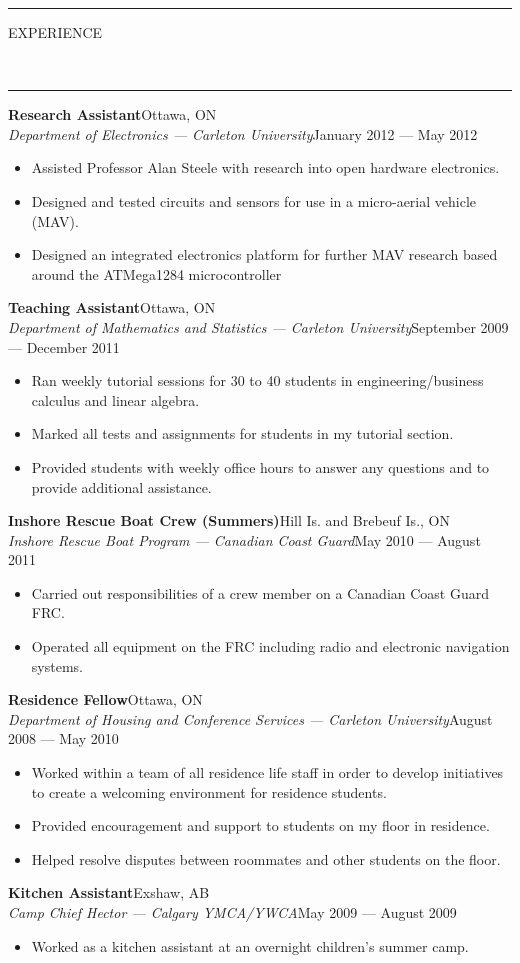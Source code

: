 \documentclass[10pt, letterpaper, oneside]{article}
\newcommand{\HRule}[2]{\textcolor{#1}{\rule{\linewidth}{#2}}}
\newcommand{\sectiontitle}[1]{\begin{minipage}{\textwidth}\HRule{black}{0.25mm}\vspace{-10pt}\begin{center}\Large\MakeUppercase{#1}\end{center}\end{minipage}\\\HRule{light-grey}{0.15mm}\vspace{\baselineskip}}
\newenvironment{ressection}[1]{
  \sectiontitle{#1}}
  {\vspace{-\baselineskip}}
\newcommand{\resitem}[1]{
	\vspace{2pt}
	\item \begin{flushleft} #1 \end{flushleft}
}
\newcommand{\resentryheader}[4]{
	\vspace{-5pt}
	\textbf{#1}\hspace{\stretch{1}}\textcolor{light-grey}{#3}\\
	\textit{#2}\hspace{\stretch{1}}\textcolor{light-grey}{#4}\\
}
\newenvironment{resentry}[4]{
  \begin{minipage}{\textwidth}
	\resentryheader{#1}{#2}{#3}{#4}
        \vspace{-\baselineskip}
	\begin{itemize}[noitemsep,nolistsep]
}{
	\end{itemize}
        \vspace{\baselineskip}
        \end{minipage}
}
\begin{document}
\begin{ressection}{experience}
  \begin{resentry}{Research Assistant}{Department of Electronics --- Carleton University}{Ottawa, ON}{January 2012 --- May 2012}
    \resitem{Assisted Professor Alan Steele with research into open hardware electronics.}
    \resitem{Designed and tested circuits and sensors for use in a micro-aerial vehicle (MAV).}
    \resitem{Designed an integrated electronics platform for further MAV research based around the ATMega1284 microcontroller}
  \end{resentry}

  \begin{resentry}{Teaching Assistant}{Department of Mathematics and Statistics --- Carleton University}{Ottawa, ON}{September 2009 --- December 2011}
    \resitem{Ran weekly tutorial sessions for 30 to 40 students in engineering/business calculus and linear algebra.}
    \resitem{Marked all tests and assignments for students in my tutorial section.}
    \resitem{Provided students with weekly office hours to answer any questions and to provide additional assistance.}
  \end{resentry}

  \begin{resentry}{Inshore Rescue Boat Crew (Summers)}{Inshore Rescue Boat Program --- Canadian Coast Guard}{Hill Is. and Brebeuf Is., ON}{May 2010 --- August 2011}
    \resitem{Carried out responsibilities of a crew member on a Canadian Coast Guard FRC.}
    \resitem{Operated all equipment on the FRC including radio and electronic navigation systems.}
  \end{resentry}

  \begin{resentry}{Residence Fellow}{Department of Housing and Conference Services --- Carleton University}{Ottawa, ON}{August 2008 --- May 2010}
    \resitem{Worked within a team of all residence life staff in order to develop initiatives to create a welcoming environment for residence students.}
    \resitem{Provided encouragement and support to students on my floor in residence.}
    \resitem{Helped resolve disputes between roommates and other students on the floor.}
  \end{resentry}

  \begin{resentry}{Kitchen Assistant}{Camp Chief Hector --- Calgary YMCA/YWCA}{Exshaw, AB}{May 2009 --- August 2009}
    \resitem{Worked as a kitchen assistant at an overnight children's summer camp.}
  \end{resentry}


\end{ressection}
\end{document}
